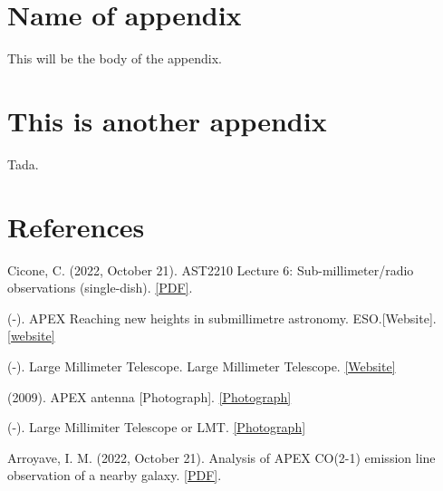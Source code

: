 \documentclass[reprint,english,notitlepage]{revtex4-2}  %
\begin{document}
\newpage

\appendix
\section{Name of appendix}
This will be the body of the appendix.
\section{This is another appendix}\label{appendix}
Tada.



\clearpage
\onecolumngrid
\section{References}
\begin{thebibliography}{9}

Cicone, C. (2022, October 21). AST2210 Lecture 6: Sub-millimeter/radio observations (single-dish). \href{https://bibsys-k.alma.exlibrisgroup.com/leganto/public/47BIBSYS_UBO/citation/14898320160002204?auth=SAML}{[PDF]}.

(-). APEX Reaching new heights in submillimetre astronomy. ESO.[Website]. \href{https://www.eso.org/public/teles-instr/apex/}{[website]}

(-). Large Millimeter Telescope. Large Millimeter Telescope. \href{http://lmtgtm.org/}{[Website]}

(2009). APEX antenna [Photograph]. \href{https://www.eso.org/public/images/apex-mar2009-1671/}{[Photograph]}

(-). Large Millimiter Telescope or LMT. \href{https://mxcity.mx/wp-content/uploads/2019/04/galGTM16.jpeg}{[Photograph]}

Arroyave, I. M. (2022, October 21). Analysis of APEX CO(2-1) emission line observation of a nearby galaxy. \href{https://drive.google.com/file/d/1Y9YKh_9BOnJ547KBhBBsiDhk9iVBG3N6/view?usp=sharing}{[PDF]}.

\end{thebibliography}
\end{document}
